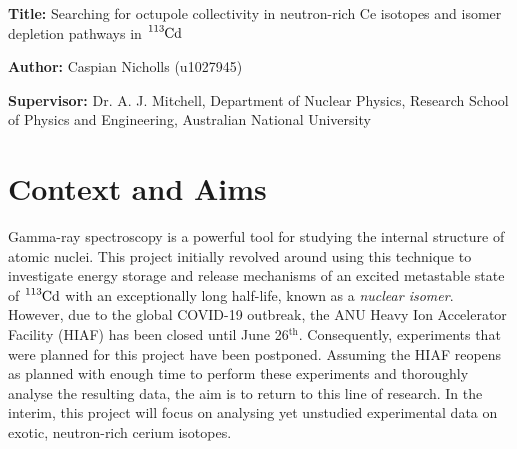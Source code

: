 \documentclass[12pt,a4paper]{article}
\begin{document}

\noindent
\textbf{Title: }Searching for octupole collectivity in neutron-rich Ce isotopes and isomer depletion pathways in $\ce{^{113}Cd}$

\noindent
\textbf{Author: } Caspian Nicholls (u1027945)

\noindent
\textbf{Supervisor: } Dr. A. J. Mitchell, Department of Nuclear Physics, Research School of Physics and Engineering, Australian National University

%
%

\section*{Context and Aims}

Gamma-ray spectroscopy is a powerful tool for studying the internal structure of atomic nuclei.
This project initially revolved around using this technique to investigate energy storage and release mechanisms of an excited metastable state of $\ce{^{113}Cd}$ with an exceptionally long half-life, known as a \textit{nuclear isomer}.
However, due to the global COVID-19 outbreak, the ANU Heavy Ion Accelerator Facility (HIAF) has been closed until June 26$^\text{th}$.
Consequently, experiments that were planned for this project have been postponed.
Assuming the HIAF reopens as planned with enough time to perform these experiments and thoroughly analyse the resulting data, the aim is to return to this line of research.
In the interim, this project will focus on analysing yet unstudied experimental data on exotic, neutron-rich cerium isotopes.
\end{document}
